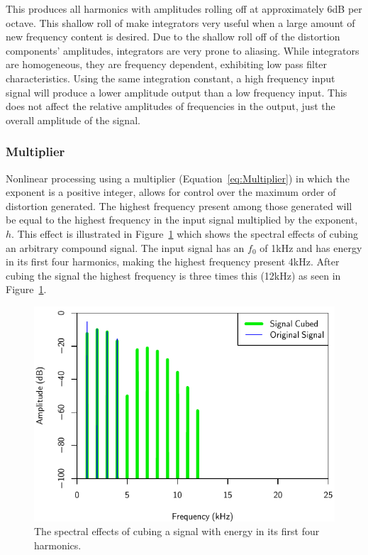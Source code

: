 			This produces all harmonics with amplitudes rolling off at approximately 6dB per octave. This
			shallow roll of make integrators very useful when a large amount of new frequency content is
			desired. Due to the shallow roll off of the distortion components' amplitudes, integrators are very
			prone to aliasing. While integrators are homogeneous, they are frequency dependent, exhibiting low
			pass filter characteristics. Using the same integration constant, a high frequency input signal
			will produce a lower amplitude output than a low frequency input. This does not affect the
			relative amplitudes of frequencies in the output, just the overall amplitude of the signal.

		\subsubsection*{Multiplier}
			Nonlinear processing using a multiplier (Equation~\ref{eq:Multiplier}) in which the exponent is a
			positive integer, allows for control over the maximum order of distortion generated. The highest
			frequency present among those generated will be equal to the highest frequency in the input signal
			multiplied by the exponent, $h$. This effect is illustrated in Figure~\ref{fig:CubedSpectra} which
			shows the spectral effects of cubing an arbitrary compound signal. The input signal has an $f_{0}$
			of 1kHz and has energy in its first four harmonics, making the highest frequency present 4kHz.
			After cubing the signal the highest frequency is three times this (12kHz) as seen in
			Figure~\ref{fig:CubedSpectra}.

			\begin{figure}[h!]
				\centering
				\includegraphics{chapter5/Images/CubedSpectra.pdf}
				\caption{The spectral effects of cubing a signal with energy in its first four harmonics.}
				\label{fig:CubedSpectra}
			\end{figure}

